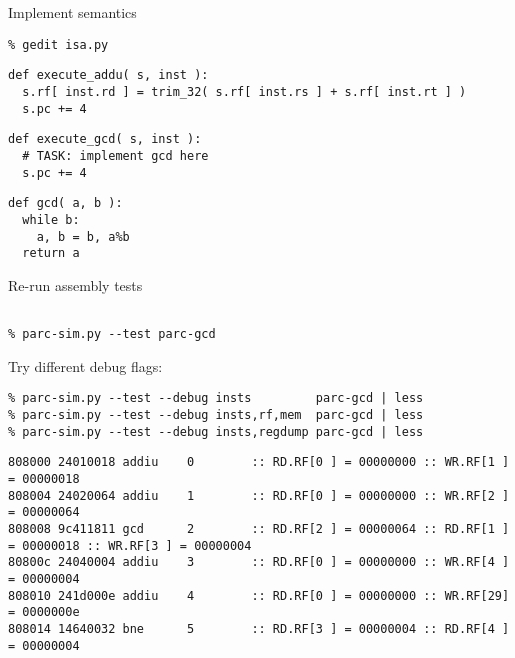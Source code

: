 \begin{task}
\begin{frame}[fragile]{Implement semantics}

\vspace{-15pt}

\begin{Verbatim}[commandchars=\\\{\}]
% cd \midtilde/pydgin/parc
% gedit isa.py
\end{Verbatim}

\begin{lstlisting}[firstnumber=319]
def execute_addu( s, inst ):
  s.rf[ inst.rd ] = trim_32( s.rf[ inst.rs ] + s.rf[ inst.rt ] )
  s.pc += 4
\end{lstlisting}
\vspace{-10pt}
\begin{lstlisting}[firstnumber=976]
def execute_gcd( s, inst ):
  # TASK: implement gcd here
  s.pc += 4
\end{lstlisting}
\vspace{-10pt}
\begin{lstlisting}[numbers=none]
def gcd( a, b ):
  while b:
    a, b = b, a%b
  return a
\end{lstlisting}

\end{frame}
\end{task}


\begin{task}
\begin{frame}[fragile]{Re-run assembly tests}

\begin{Verbatim}[commandchars=\\\{\}]
% cd \midtilde/pydgin/parc/asm_tests/build

% parc-sim.py --test parc-gcd
\end{Verbatim}

Try different debug flags:

{\small
\begin{verbatim}
% parc-sim.py --test --debug insts         parc-gcd | less
% parc-sim.py --test --debug insts,rf,mem  parc-gcd | less
% parc-sim.py --test --debug insts,regdump parc-gcd | less
\end{verbatim}}
{\tiny
\begin{verbatim}
808000 24010018 addiu    0        :: RD.RF[0 ] = 00000000 :: WR.RF[1 ] = 00000018
808004 24020064 addiu    1        :: RD.RF[0 ] = 00000000 :: WR.RF[2 ] = 00000064
808008 9c411811 gcd      2        :: RD.RF[2 ] = 00000064 :: RD.RF[1 ] = 00000018 :: WR.RF[3 ] = 00000004
80800c 24040004 addiu    3        :: RD.RF[0 ] = 00000000 :: WR.RF[4 ] = 00000004
808010 241d000e addiu    4        :: RD.RF[0 ] = 00000000 :: WR.RF[29] = 0000000e
808014 14640032 bne      5        :: RD.RF[3 ] = 00000004 :: RD.RF[4 ] = 00000004
\end{verbatim}}
\end{frame}
\end{task}

